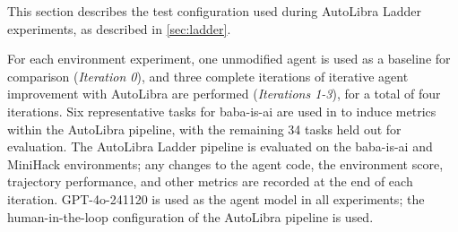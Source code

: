 This section describes the test configuration used during AutoLibra Ladder experiments, as described in \ref{sec:ladder}.

For each environment experiment, one unmodified agent is used as a baseline for comparison (\textit{Iteration 0}), and three complete iterations of iterative agent improvement with AutoLibra are performed (\textit{Iterations 1-3}), for a total of four iterations. Six representative tasks for baba-is-ai are used in to induce metrics within the AutoLibra pipeline, with the remaining 34 tasks held out for evaluation. The AutoLibra Ladder pipeline is evaluated on the baba-is-ai and MiniHack environments; any changes to the agent code, the environment score, trajectory performance, and other metrics are recorded at the end of each iteration. GPT-4o-241120 \cite{openai2024gpt4ocard} is used as the agent model in all experiments; the human-in-the-loop configuration of the AutoLibra pipeline is used.
